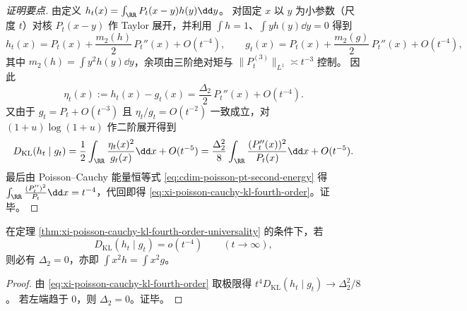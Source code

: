 \begin{proof}[证明要点]
由定义 \(h_t(x)=\int_{\RR}P_t(x-y)h(y)\dd y\)。
对固定 \(x\) 以 \(y\) 为小参数（尺度 \(t\)）对核 \(P_t(x-y)\) 作 Taylor 展开，并利用 \(\int h=1\)、\(\int yh(y)\dd y=0\) 得到
\[
h_t(x)=P_t(x)+\frac{m_2(h)}{2}\,P_t''(x)+O(t^{-4}),
\qquad
g_t(x)=P_t(x)+\frac{m_2(g)}{2}\,P_t''(x)+O(t^{-4}),
\]
其中 \(m_2(h)=\int y^2h(y)\dd y\)，余项由三阶绝对矩与 \(\|P_t^{(3)}\|_{L^1}\asymp t^{-3}\) 控制。
因此
\[
\eta_t(x):=h_t(x)-g_t(x)=\frac{\Delta_2}{2}\,P_t''(x)+O(t^{-4}).
\]
又由于 \(g_t=P_t+O(t^{-3})\) 且 \(\eta_t/g_t=O(t^{-2})\) 一致成立，对 \((1+u)\log(1+u)\) 作二阶展开得到
\[
D_{\mathrm{KL}}(h_t\mid g_t)
=\frac12\int_{\RR}\frac{\eta_t(x)^2}{g_t(x)}\dd x+O(t^{-5})
=\frac{\Delta_2^2}{8}\int_{\RR}\frac{(P_t''(x))^2}{P_t(x)}\dd x+O(t^{-5}).
\]
最后由 Poisson--Cauchy 能量恒等式 \eqref{eq:cdim-poisson-pt-second-energy} 得
\(
\int_{\RR}\frac{(P_t'')^2}{P_t}\dd x=t^{-4}
\)，代回即得 \eqref{eq:xi-poisson-cauchy-kl-fourth-order}。证毕。
\end{proof}

\begin{corollary}\label{cor:xi-poisson-cauchy-kl-moment-locking}
在定理 \ref{thm:xi-poisson-cauchy-kl-fourth-order-universality} 的条件下，若
\[
D_{\mathrm{KL}}(h_t\mid g_t)=o(t^{-4})\qquad(t\to\infty),
\]
则必有 \(\Delta_2=0\)，亦即 \(\int x^2h=\int x^2g\)。
\end{corollary}

\begin{proof}
由 \eqref{eq:xi-poisson-cauchy-kl-fourth-order} 取极限得
\(
t^4D_{\mathrm{KL}}(h_t\mid g_t)\to \Delta_2^2/8
\)。
若左端趋于 \(0\)，则 \(\Delta_2=0\)。证毕。
\end{proof}

